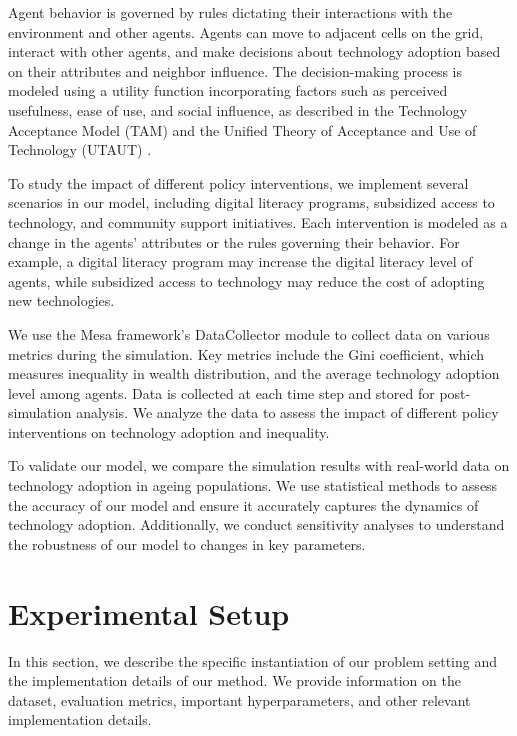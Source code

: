 \documentclass{article} %
\begin{document}
Agent behavior is governed by rules dictating their interactions with the environment and other agents. Agents can move to adjacent cells on the grid, interact with other agents, and make decisions about technology adoption based on their attributes and neighbor influence. The decision-making process is modeled using a utility function incorporating factors such as perceived usefulness, ease of use, and social influence, as described in the Technology Acceptance Model (TAM) and the Unified Theory of Acceptance and Use of Technology (UTAUT) \citep{zhou2023peer}.

To study the impact of different policy interventions, we implement several scenarios in our model, including digital literacy programs, subsidized access to technology, and community support initiatives. Each intervention is modeled as a change in the agents' attributes or the rules governing their behavior. For example, a digital literacy program may increase the digital literacy level of agents, while subsidized access to technology may reduce the cost of adopting new technologies.

We use the Mesa framework's DataCollector module to collect data on various metrics during the simulation. Key metrics include the Gini coefficient, which measures inequality in wealth distribution, and the average technology adoption level among agents. Data is collected at each time step and stored for post-simulation analysis. We analyze the data to assess the impact of different policy interventions on technology adoption and inequality.

To validate our model, we compare the simulation results with real-world data on technology adoption in ageing populations. We use statistical methods to assess the accuracy of our model and ensure it accurately captures the dynamics of technology adoption. Additionally, we conduct sensitivity analyses to understand the robustness of our model to changes in key parameters.

\section{Experimental Setup}
\label{sec:experimental}

In this section, we describe the specific instantiation of our problem setting and the implementation details of our method. We provide information on the dataset, evaluation metrics, important hyperparameters, and other relevant implementation details.
\end{document}
